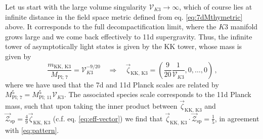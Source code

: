 Let us start with the large volume singularity $\mathcal{V}_{K3} \to \infty$, which of course lies at infinite distance in the field space metric defined from eq. \eqref{eq:7dMthymetric} above. It corresponds to the full decompactification limit, where the $K3$ manifold grows large and we come back effectively to 11d supergravity. Thus, the infinite tower of asymptotically light states is given by the KK tower, whose mass is given by
%
\begin{equation}
	\frac{m_{\text{KK, K3}}}{M_{\text{Pl};\, 7}} = \mathcal{V}_{K3}^{-9/20} \quad \Longrightarrow \quad \vec{\zeta}_{\text{KK, K3}} = \left( \frac{9}{20} \frac{1}{\mathcal{V}_{K3}}, 0, \ldots, 0 \right)\, ,
\end{equation}
%
where we have used that the 7d and 11d Planck scales are related by $M_{\text{Pl};\, 7}^5= M_{\text{Pl};\, 11}^5 \mathcal{V}_{K3}$. The associated species scale corresponds to the 11d Planck mass, such that upon taking the inner product between $\vec{\zeta}_{\text{KK, K3}}$ and $\vec{\mathcal{Z}}_{\text{sp}} = \frac{4}{9} \vec{\zeta}_{\text{KK, K3}}$ (c.f. eq. \eqref{eq:eff-vector}) we find that $\vec{\zeta}_{\text{KK, K3}} \cdot \vec{\mathcal{Z}}_{\text{sp}}= \frac{1}{5}$, in agreement with \eqref{eq:pattern}.
	
